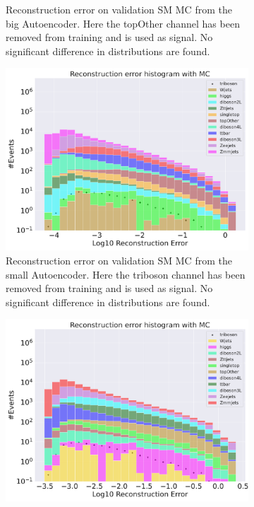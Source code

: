 \begin{figure}[h!]
\begin{subfigure}{.45\textwidth}
        \caption{Reconstruction error on validation SM MC from the big Autoencoder. Here the topOther channel has been removed from training and 
        is used as signal. No significant difference in distributions are found. }
        \label{fig:ae_big_topOther}
    \end{subfigure}
    \hfill
    \begin{subfigure}{.45\textwidth}
        \includegraphics[width=\textwidth]{Figures/AE_testing/small/b_data_recon_big_rm3_feats_sig_triboson.pdf}
        \caption{Reconstruction error on validation SM MC from the small Autoencoder. Here the triboson channel has been removed from training and 
        is used as signal. No significant difference in distributions are found. }
        \label{fig:ae_small_triboson}
    \end{subfigure}
    \hfill 
    \begin{subfigure}{.45\textwidth}
        \includegraphics[width=\textwidth]{Figures/AE_testing/big/b_data_recon_big_rm3_feats_sig_triboson.pdf}

\end{subfigure}
\end{figure}
